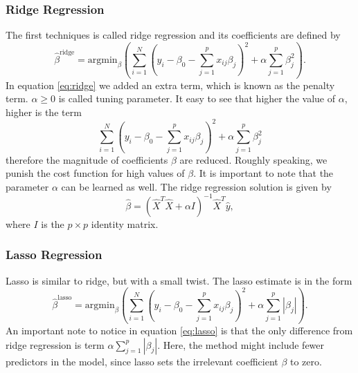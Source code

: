\documentclass [11pt]{article}
\begin{document}
\subsubsection*{Ridge Regression}
The first techniques is called ridge regression and its coefficients are defined by \cite{TRJ}
\begin{equation}
\hat{\beta}^{\text{ridge}}=\text{argmin}_{\beta} ( \sum_{i=1}^{N}(y_{i}- \beta_{0}- \sum_{j=1}^{p}x_{ij}\beta_{j})^{2}+ \alpha \sum_{j=1}^{p} \beta_{j}^{2}).
\label{eq:ridge}
\end{equation}
In equation \eqref{eq:ridge} we added an extra term, which is known as the penalty term. $\alpha \geq 0$ is called tuning parameter. It easy to see that higher the value of $\alpha$, higher is the term 
\begin{equation*}
\sum_{i=1}^{N}(y_{i}- \beta_{0}- \sum_{j=1}^{p}x_{ij}\beta_{j})^{2}+ \alpha \sum_{j=1}^{p} \beta_{j}^{2}
\end{equation*}
therefore the magnitude of coefficients $\beta$ are reduced. Roughly speaking, we punish the cost function for high values of $\beta$. It is important to note that the parameter $\alpha$ can be learned as well. The ridge regression solution is given by
\begin{equation}
\hat{\beta} =\left(\hat{X}^T\hat{X} + \alpha I \right)^{-1}\hat{X}^T\hat{y},
\end{equation}
where $I$ is the $p \times p$ identity matrix.
\subsubsection*{Lasso Regression}
Lasso is similar to ridge, but with a small twist. The lasso estimate is in the form \cite{TRJ}
\begin{equation}
\hat{\beta}^{\text{lasso}}=\text{argmin}_{\beta} ( \sum_{i=1}^{N}(y_{i}- \beta_{0}- \sum_{j=1}^{p}x_{ij}\beta_{j})^{2}+ \alpha \sum_{j=1}^{p} |\beta_{j}|).
\label{eq:lasso}
\end{equation}
An important note to notice in equation \eqref{eq:lasso} is that the only difference from ridge regression is term $\alpha \sum_{j=1}^{p} |\beta_{j}|$. Here, the method might include fewer predictors in the model, since lasso sets the irrelevant coefficient $\beta$ to zero.
\end{document}
